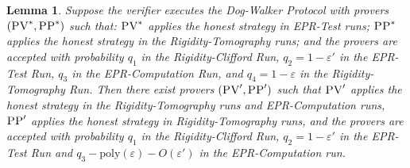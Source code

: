 \documentclass[11pt]{article}
\numberwithin{equation}{section}
\newtheorem{lemma}[theorem]{Lemma}
\theoremstyle{definition}
\theoremstyle{plain}
\newcommand{\eps}{\varepsilon}
\newcommand{\pv}{\textsc{PV}}
\newcommand{\pp}{\textsc{PP}}
\begin{document}
\begin{lemma}\label{lem:PV-34}
Suppose the verifier executes the Dog-Walker Protocol with provers $(\pv^*,\pp^*)$ such that: $\pv^*$ applies the honest strategy in EPR-Test runs; 
$\pp^*$ applies the honest strategy in the Rigidity-Tomography runs; and the provers are accepted with probability $q_1$ in the Rigidity-Clifford Run, $q_2 = 1-\eps'$ in the EPR-Test Run, $q_3$ in the EPR-Computation Run, and $q_4=1-\eps$ in the Rigidity-Tomography Run. Then there exist provers $(\pv',\pp')$ such that $\pv'$ applies the honest strategy in the Rigidity-Tomography runs and EPR-Computation runs, $\pp'$ applies the honest strategy in Rigidity-Tomography runs, and
the provers are accepted with probability $q_1$ in the Rigidity-Clifford Run, $q_2 = 1-\eps'$ in the EPR-Test Run and $q_3-\mathrm{poly}(\eps)-O(\eps')$ in the EPR-Computation run. 
\end{lemma}
\end{document}
